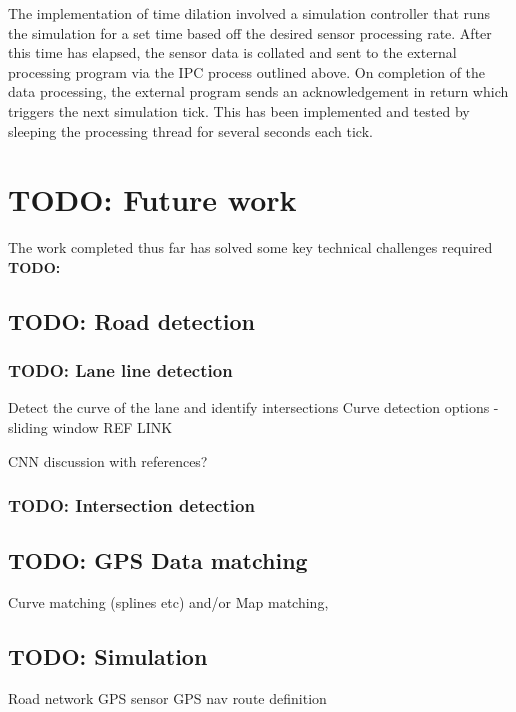 \documentclass[]{aiaa-tc}%
\begin{document}
The implementation of time dilation involved a simulation controller that runs the simulation for a set time based off the desired sensor processing rate. After this time has elapsed, the sensor data is collated and sent to the external processing program via the IPC process outlined above. On completion of the data processing, the external program sends an acknowledgement in return which triggers the next simulation tick. This has been implemented and tested by sleeping the processing thread for several seconds each tick.

\section{TODO: Future work}

The work completed thus far has solved some key technical challenges required \textbf{TODO: }

\subsection{TODO: Road detection}

\subsubsection{TODO: Lane line detection}

Detect the curve of the lane and identify intersections
Curve detection options - sliding window REF LINK %

CNN discussion with references?

\subsubsection{TODO: Intersection detection}

\subsection{TODO: GPS Data matching}
Curve matching (splines etc) and/or Map matching, 

\subsection{TODO: Simulation}

Road network
GPS sensor
GPS nav route definition
\end{document}
